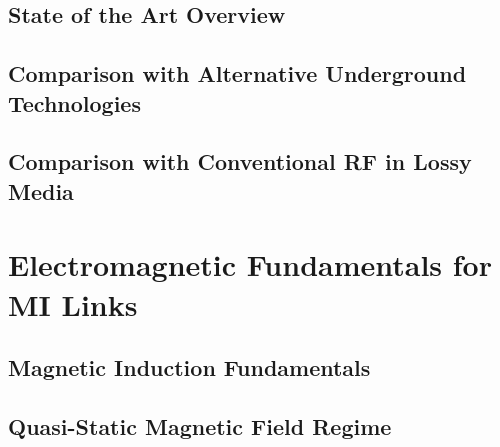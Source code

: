 \subsection{State of the Art Overview}\label{subsec:state-of-art}

\subsection{Comparison with Alternative Underground Technologies}\label{subsec:comparison-alternative-tech}

\subsection{Comparison with Conventional RF in Lossy Media}\label{subsec:overview-mi-vs-rf}

\section{Electromagnetic Fundamentals for MI Links}\label{sec:em-fundamentals}

\subsection{Magnetic Induction Fundamentals}\label{subsec:magnetic-induction-fundamentals}

\subsection{Quasi-Static Magnetic Field Regime}\label{subsec:quasi-static}

